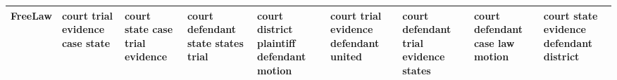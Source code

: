 \documentclass[11pt,a4paper]{article}
\begin{document}
\begin{appendices}
\begin{table}[htp]
\begin{tiny}
\begin{tabular}{|p{}|p{}|p{}|p{}|p{}|p{}|p{}|p{}|p{}|}
FreeLaw & court \newline trial \newline evidence \newline case \newline state & court \newline state \newline case \newline trial \newline evidence & court \newline defendant \newline state \newline states \newline trial & court \newline district \newline plaintiff \newline defendant \newline motion & court \newline trial \newline evidence \newline defendant \newline united & court \newline defendant \newline trial \newline evidence \newline states & court \newline defendant \newline case \newline law \newline motion & court \newline state \newline evidence \newline defendant \newline district\\\hline

\end{tabular}
\end{tiny}
\end{table}
\end{appendices}
\end{document}
